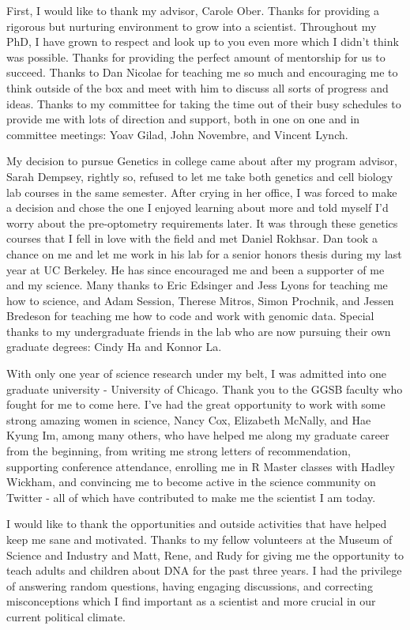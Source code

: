 \acknowledgments

First, I would like to thank my advisor, Carole Ober. Thanks for providing a rigorous but nurturing environment to grow into a scientist. Throughout my PhD, I have grown to respect and look up to you even more which I didn't think was possible. Thanks for providing the perfect amount of mentorship for us to succeed. Thanks to Dan Nicolae for teaching me so much and encouraging me to think outside of the box and meet with him to discuss all sorts of progress and ideas. Thanks to my committee for taking the time out of their busy schedules to provide me with lots of direction and support, both in one on one and in committee meetings: Yoav Gilad, John Novembre, and Vincent Lynch.  

My decision to pursue Genetics in college came about after my program advisor, Sarah Dempsey, rightly so, refused to let me take both genetics and cell biology lab courses in the same semester. After crying in her office, I was forced to make a decision and chose the one I enjoyed learning about more and told myself I'd worry about the pre-optometry requirements later. It was through these genetics courses that I fell in love with the field and met Daniel Rokhsar. Dan took a chance on me and let me work in his lab for a senior honors thesis during my last year at UC Berkeley. He has since encouraged me and been a supporter of me and my science. Many thanks to Eric Edsinger and Jess Lyons for teaching me how to science, and Adam Session, Therese Mitros, Simon Prochnik, and Jessen Bredeson for teaching me how to code and work with genomic data. Special thanks to my undergraduate friends in the lab who are now pursuing their own graduate degrees: Cindy Ha and Konnor La. 

With only one year of science research under my belt, I was admitted into one graduate university - University of Chicago. Thank you to the GGSB faculty who fought for me to come here. I've had the great opportunity to work with some strong amazing women in science, Nancy Cox, Elizabeth McNally, and Hae Kyung Im, among many others, who have helped me along my graduate career from the beginning, from writing me strong letters of recommendation, supporting conference attendance, enrolling me in R Master classes with Hadley Wickham, and convincing me to become active in the science community on Twitter - all of which have contributed to make me the scientist I am today.

I would like to thank the opportunities and outside activities that have helped keep me sane and motivated. Thanks to my fellow volunteers at the Museum of Science and Industry and Matt, Rene, and Rudy for giving me the opportunity to teach adults and children about DNA for the past three years. I had the privilege of answering random questions, having engaging discussions, and correcting misconceptions which I find important as a scientist and more crucial in our current political climate.

